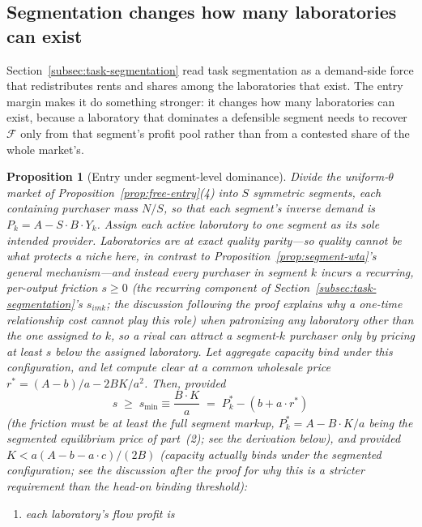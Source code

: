 \documentclass[11pt]{article}
\newtheorem{proposition}{Proposition}
\begin{document}
\subsection{Segmentation changes how many laboratories can exist}
\label{subsec:segmented-entry}

Section~\ref{subsec:task-segmentation} read task segmentation as a demand-side force that redistributes rents and shares among the laboratories that exist. The entry margin makes it do something stronger: it changes how many laboratories can exist, because a laboratory that dominates a defensible segment needs to recover $\mathcal F$ only from that segment's profit pool rather than from a contested share of the whole market's.

\begin{proposition}[Entry under segment-level dominance]\label{prop:segmented-entry}
Divide the uniform-$\theta$ market of Proposition~\ref{prop:free-entry}(4) into $S$ symmetric segments, each containing purchaser mass $N/S$, so that each segment's inverse demand is $P_k=A-S\cdot B\cdot Y_k$. Assign each active laboratory to one segment as its sole intended provider. Laboratories are at exact quality parity---so quality cannot be what protects a niche here, in contrast to Proposition~\ref{prop:segment-wta}'s general mechanism---and instead every purchaser in segment $k$ incurs a \emph{recurring, per-output} friction $s\geq0$ (the recurring component of Section~\ref{subsec:task-segmentation}'s $s_{imk}$; the discussion following the proof explains why a one-time relationship cost cannot play this role) when patronizing any laboratory other than the one assigned to $k$, so a rival can attract a segment-$k$ purchaser only by pricing at least $s$ below the assigned laboratory. Let aggregate capacity bind under this configuration, and let compute clear at a common wholesale price $r^{*}=(A-b)/a-2BK/a^{2}$. Then, provided
\begin{equation}\label{eq:friction-threshold}s\;\geq\;s_{\min}\equiv\frac{B\cdot K}{a}\;=\;P_k^{*}-\left(b+a\cdot r^{*}\right)\end{equation}
(the friction must be at least the full segment markup, $P_k^{*}=A-B\cdot K/a$ being the segmented equilibrium price of part~(2); see the derivation below),
and provided $K<a(A-b-a\cdot c)/(2B)$ (capacity actually binds under the segmented configuration; see the discussion after the proof for why this is a stricter requirement than the head-on binding threshold):
\begin{enumerate}
\item each laboratory's flow profit is

\end{enumerate}
\end{proposition}
\end{document}
